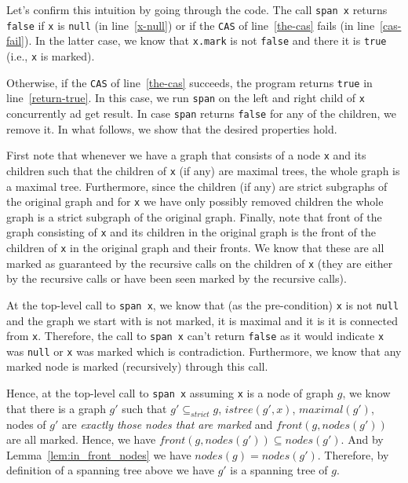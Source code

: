 \documentclass[nocopyrightspace]{sigplanconf}
\def\MyMLe{\lstinline[language=MyML, basicstyle=\small\ttfamily]}
\newcommand{\nodes}{\mathit{nodes}}
\newcommand{\front}{\mathit{front}}
\newcommand{\maximal}{\mathit{maximal}}
\newcommand{\istree}{\mathit{istree}}
\newcommand{\strictSG}{\subseteq_{\mathit{strict}}}
\begin{document}
Let's confirm this intuition by going through the code.
The call \MyMLe{span x} returns \MyMLe{false} if \MyMLe{x} is \MyMLe{null}
(in line~\ref{x-null}) or if the \MyMLe{CAS} of line~\ref{the-cas} fails (in line~\ref{cas-fail}).
In the latter case, we know that \MyMLe{x.mark} is not \MyMLe{false} and there it
is \MyMLe{true} (i.e., \MyMLe{x} is marked).

Otherwise, if the \MyMLe{CAS} of line~\ref{the-cas} succeeds, the program returns \MyMLe{true} in line~\ref{return-true}.
In this case, we run \MyMLe{span} on the left and right child of \MyMLe{x} concurrently ad get result.
In case \MyMLe{span} returns \MyMLe{false} for any of the children, we remove it.
In what follows, we show that the desired properties hold.

First note that whenever we have a graph that consists of a node \MyMLe{x} and its children such that
 the children of \MyMLe{x} (if any) are maximal trees, the whole graph is a maximal tree.
Furthermore, since the children (if any) are strict subgraphs of the original graph
and for \MyMLe{x} we have only possibly removed children the whole graph
is a strict subgraph of the original graph.
Finally, note that front of the graph consisting of \MyMLe{x} and its children in the original graph is
the front of the children of \MyMLe{x} in the original graph and their fronts.
We know that these are all marked as guaranteed by the recursive calls on the children of \MyMLe{x} (they are either by the recursive calls or have been seen marked by the recursive calls).

At the top-level call to \MyMLe{span x}, we know that (as the pre-condition) \MyMLe{x} is not \MyMLe{null} and the graph we start with is not marked, it is maximal and it is it is connected from \MyMLe{x}.
Therefore, the call to \MyMLe{span x} can't return \MyMLe{false} as it would indicate \MyMLe{x} was \MyMLe{null} or \MyMLe{x} was marked which is contradiction.
Furthermore, we know that any marked node is marked (recursively) through this call.

Hence, at the top-level call to \MyMLe{span x} assuming \MyMLe{x} is a node of graph $g$, we know that there is a graph $g'$ such that
$g' \strictSG g$, $\istree(g', x)$, $\maximal(g')$, nodes of $g'$ are \emph{exactly those nodes that are marked} and $\front(g, \nodes(g'))$ are all marked.
Hence, we have $\front(g, \nodes(g')) \subseteq \nodes(g')$.
And by Lemma~\ref{lem:in_front_nodes} we have $\nodes(g) = \nodes(g')$.
Therefore, by definition of a spanning tree above we have $g'$ is a spanning tree
of $g$.
\end{document}
